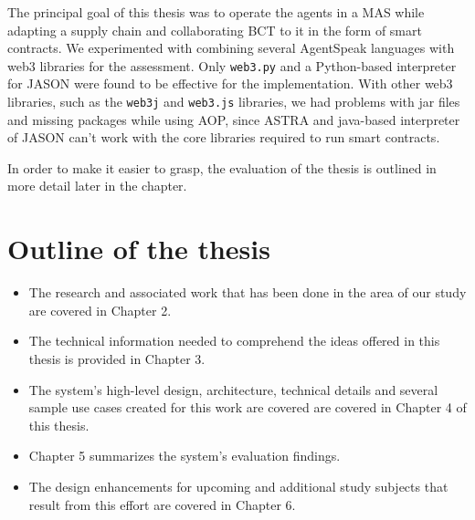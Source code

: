 The principal goal of this thesis was to operate the agents in a \ac{MAS} while adapting a supply chain and collaborating \ac{BCT} to it in the form of smart contracts. We experimented with combining several AgentSpeak languages with web3 libraries for the assessment. Only \texttt{web3.py} and a Python-based interpreter for JASON were found to be effective for the implementation. With other web3 libraries, such as the \texttt{web3j} and \texttt{web3.js} libraries, we had problems with jar files and missing packages while using \ac{AOP}, since \ac{ASTRA} and java-based interpreter of JASON can't work with the core libraries required to run smart contracts.

 \vspace{.5cm}
 
In order to make it easier to grasp, the evaluation of the thesis is outlined in more detail later in the chapter.

\section{Outline of the thesis}
\begin{itemize}
    \item The research and associated work that has been done in the area of our study are covered in Chapter 2.
    
\vspace{.5cm}

    \item The technical information needed to comprehend the ideas offered in this thesis is provided in Chapter 3.
    
\vspace{.5cm}

    \item The system's high-level design, architecture, technical details and several sample use cases created for this work are covered  are covered in Chapter 4 of this thesis.
    
\vspace{.5cm}

    \item Chapter 5 summarizes the system's evaluation findings.
    
\vspace{.5cm}

    \item The design enhancements for upcoming and additional study subjects that result from this effort are covered in Chapter 6.
\end{itemize}


